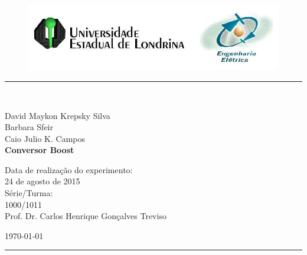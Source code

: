 \begin{titlepage}
\begin{center}
\begin{figure}[h]
\includegraphics[scale=0.76]{img/topdotitulo.png}
\end{figure}
\rule{\columnwidth}{1.5mm}
\

\large David Maykon Krepsky Silva\\
Barbara Sfeir\\
Caio Julio K. Campos\\

\vspace{4cm}
{\bf \Large Conversor Boost}
\vspace{3.5cm}

\begin{flushright}
Data de realização do experimento:\\
24 de agosto de 2015\\
Série/Turma:\\
1000/1011\\
Prof. Dr. Carlos Henrique Gonçalves Treviso
\end{flushright}

\vspace{3.2cm}
\today

\rule{\columnwidth}{1.3mm}
\end{center}
\end{titlepage}